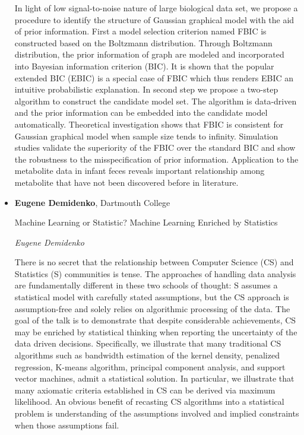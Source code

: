 \begin{itemize}
In light of low signal-to-noise nature of large biological data set, we propose a procedure to identify the structure of Gaussian graphical model with the aid of prior information. First a model selection criterion named FBIC is constructed based on the Boltzmann distribution. Through Boltzmann distribution, the prior information of graph are modeled and incorporated into Bayesian information criterion (BIC). It is shown that the popular extended BIC (EBIC) is a special case of FBIC which thus renders EBIC an intuitive probabilistic explanation. In second step we propose a two-step algorithm to construct the candidate model set. The algorithm is data-driven and the prior information can be embedded into the candidate model automatically. Theoretical investigation shows that FBIC is consistent for Gaussian graphical model when sample size tends to infinity. Simulation studies validate the superiority of the FBIC over the standard BIC and show the robustness to the misspecification of prior information. Application to the metabolite data in infant feces reveals important relationship among metabolite that have not been discovered before in literature.

\item \textbf{Eugene Demidenko}, Dartmouth College

Machine Learning or Statistic? Machine Learning Enriched by Statistics

\emph{\footnotesize Eugene Demidenko}

There is no secret that the relationship between Computer Science (CS) and Statistics (S) communities is tense. The approaches of handling data analysis are fundamentally different in these two schools of thought: S assumes a statistical model with carefully stated assumptions, but the CS approach is assumption-free and solely relies on algorithmic processing of the data. The goal of the talk is to demonstrate that despite considerable achievements, CS may be enriched by statistical thinking when reporting the uncertainty of the data driven decisions. Specifically, we illustrate that many traditional CS algorithms such as bandwidth estimation of the kernel density, penalized regression, K-means algorithm, principal component analysis, and support vector machines, admit a statistical solution. In particular, we illustrate that many axiomatic criteria established in CS can be derived via maximum likelihood. An obvious benefit of recasting CS algorithms into a statistical problem is understanding of the assumptions involved and implied constraints when those assumptions fail.


\end{itemize}
